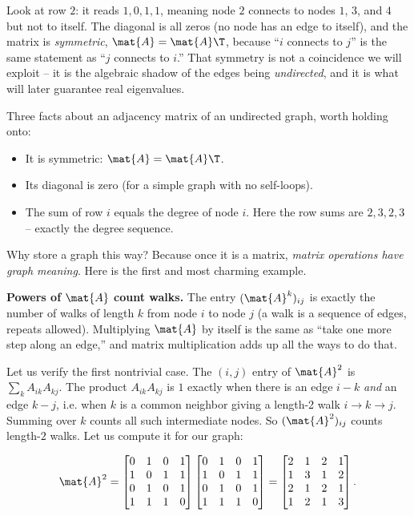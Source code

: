 Look at row $2$: it reads $1,0,1,1$, meaning node $2$ connects to nodes $1$, $3$, and $4$
but not to itself. The diagonal is all zeros (no node has an edge to itself), and the
matrix is \emph{symmetric}, $\mat{A} = \mat{A}\T$, because ``$i$ connects to $j$'' is the
same statement as ``$j$ connects to $i$.'' That symmetry is not a coincidence we will
exploit -- it is the algebraic shadow of the edges being \emph{undirected}, and it is what
will later guarantee real eigenvalues.

\begin{focusbox}
Three facts about an adjacency matrix of an undirected graph, worth holding onto:
\begin{itemize}
\item It is symmetric: $\mat{A} = \mat{A}\T$.
\item Its diagonal is zero (for a simple graph with no self-loops).
\item The sum of row $i$ equals the degree of node $i$. Here the row sums are
$2,3,2,3$ -- exactly the degree sequence.
\end{itemize}
\end{focusbox}

Why store a graph this way? Because once it is a matrix, \emph{matrix operations have
graph meaning}. Here is the first and most charming example.

\begin{intuitionbox}
\textbf{Powers of $\mat{A}$ count walks.} The entry $(\mat{A}^k)_{ij}$ is exactly the
number of walks of length $k$ from node $i$ to node $j$ (a walk is a sequence of edges,
repeats allowed). Multiplying $\mat{A}$ by itself is the same as ``take one more step
along an edge,'' and matrix multiplication adds up all the ways to do that.
\end{intuitionbox}

Let us verify the first nontrivial case. The $(i,j)$ entry of $\mat{A}^2$ is
$\sum_k A_{ik}A_{kj}$. The product $A_{ik}A_{kj}$ is $1$ exactly when there is an edge
$i\!-\!k$ \emph{and} an edge $k\!-\!j$, i.e. when $k$ is a common neighbor giving a length-2
walk $i \to k \to j$. Summing over $k$ counts all such intermediate nodes. So
$(\mat{A}^2)_{ij}$ counts length-$2$ walks. Let us compute it for our graph:

\[
\mat{A}^2 =
\begin{bmatrix}
0&1&0&1\\1&0&1&1\\0&1&0&1\\1&1&1&0
\end{bmatrix}
\begin{bmatrix}
0&1&0&1\\1&0&1&1\\0&1&0&1\\1&1&1&0
\end{bmatrix}
=
\begin{bmatrix}
2&1&2&1\\1&3&1&2\\2&1&2&1\\1&2&1&3
\end{bmatrix}.
\]

